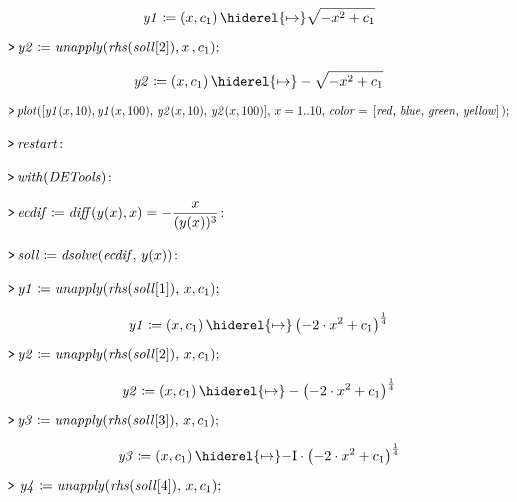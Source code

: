 \documentclass{article}
\begin{document}
\begin{dmath}\label{(5)}
\mathit{y1} \coloneqq \left(x ,c_{1}\right)\hiderel{\mapsto }\sqrt{-x^{2}+c_{1}}
\end{dmath}
\mapleinput
{$ \displaystyle \texttt{>\,} \mathit{y2} \coloneqq \mathit{unapply} (\mathit{rhs} (\mathit{soll} [2]),x \,,c_{1}); $}

\begin{dmath}\label{(6)}
\mathit{y2} \coloneqq \left(x ,c_{1}\right)\hiderel{\mapsto }-\sqrt{-x^{2}+c_{1}}
\end{dmath}
\mapleinput
{$ \displaystyle \texttt{>\,} \mathit{plot} ([\mathit{y1} (x ,10),\mathit{y1} (x ,100),\,\mathit{y2} (x ,10),\,\mathit{y2} (x ,100)],\,x =1..10,\,\mathit{color} =\,[\mathit{red} ,\,\mathit{blue} ,\,\mathit{green} ,\,\mathit{yellow}]\,); $}

{}
\mapleinput
{$ \displaystyle \texttt{>\,} \mathit{restart} \colon  $}

\mapleinput
{$ \displaystyle \texttt{>\,} \mathit{with} (\mathit{DETools})\colon  $}

\mapleinput
{$ \displaystyle \texttt{>\,} \mathit{ecdif} \coloneqq \mathit{diff} (y (x),x)=-\frac{x}{(y (x))^{3}}\colon  $}

\mapleinput
{$ \displaystyle \texttt{>\,} \mathit{soll} \coloneqq \mathit{dsolve} (\mathit{ecdif} ,\,y (x))\colon  $}

\mapleinput
{$ \displaystyle \texttt{>\,} \mathit{y1} \coloneqq \mathit{unapply} (\mathit{rhs} (\mathit{soll} [1]),\,x ,c_{1}); $}

\begin{dmath}\label{(7)}
\mathit{y1} \coloneqq \left(x ,c_{1}\right)\hiderel{\mapsto }\left(-2\cdot x^{2}+c_{1}\right)^{\frac{1}{4}}
\end{dmath}
\mapleinput
{$ \displaystyle \texttt{>\,} \mathit{y2} \coloneqq \mathit{unapply} (\mathit{rhs} (\mathit{soll} [2]),\,x ,c_{1}); $}

\begin{dmath}\label{(8)}
\mathit{y2} \coloneqq \left(x ,c_{1}\right)\hiderel{\mapsto }-\left(-2\cdot x^{2}+c_{1}\right)^{\frac{1}{4}}
\end{dmath}
\mapleinput
{$ \displaystyle \texttt{>\,} \mathit{y3} \coloneqq \mathit{unapply} (\mathit{rhs} (\mathit{soll} [3]),\,x ,c_{1});\, $}

\begin{dmath}\label{(9)}
\mathit{y3} \coloneqq \left(x ,c_{1}\right)\hiderel{\mapsto }\mathrm{-I}\cdot \left(-2\cdot x^{2}+c_{1}\right)^{\frac{1}{4}}
\end{dmath}
\mapleinput
{$ \displaystyle \texttt{>\,} \,\mathit{y4} \coloneqq \mathit{unapply} (\mathit{rhs} (\mathit{soll} [4]),\,x ,c_{1}); $}
\end{document}
